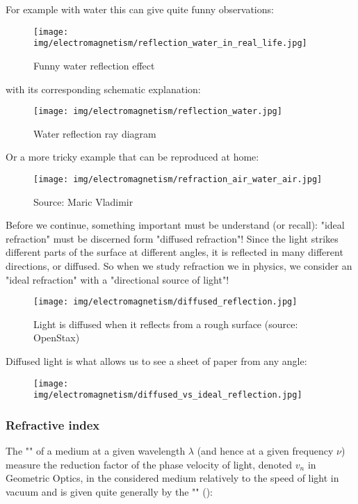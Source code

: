 	For example with water this can give quite funny observations:
	\begin{figure}[H]
		\centering
		\texttt{[image: img/electromagnetism/reflection\_water\_in\_real\_life.jpg]}
		\caption{Funny water reflection effect}
	\end{figure}
	with its corresponding schematic explanation:
	\begin{figure}[H]
		\centering
		\texttt{[image: img/electromagnetism/reflection\_water.jpg]}
		\caption{Water reflection ray diagram}
	\end{figure}
	Or a more tricky example that can be reproduced at home:
	\begin{figure}[H]
		\centering
		\texttt{[image: img/electromagnetism/refraction\_air\_water\_air.jpg]}
		\caption[]{Source: Maric Vladimir}
	\end{figure}
	Before we continue, something important must be understand (or recall): "ideal refraction" must be discerned form "diffused refraction"! Since the light strikes different parts of the surface at different angles, it is reflected in many different directions, or diffused. So when we study refraction we in physics, we consider an "ideal refraction" with a "directional source of light"!
	\begin{figure}[H]
		\centering
		\texttt{[image: img/electromagnetism/diffused\_reflection.jpg]}
		\caption[Light is diffused when it reflects from a rough surface]{Light is diffused when it reflects from a rough surface (source: OpenStax)}
	\end{figure}
	Diffused light is what allows us to see a sheet of paper from any angle:
	\begin{figure}[H]
		\centering
		\texttt{[image: img/electromagnetism/diffused\_vs\_ideal\_reflection.jpg]}
	\end{figure}
	
	\pagebreak
	\subsubsection{Refractive index}
	The "" of a medium at a given wavelength $\lambda$ (and hence at a given frequency $\nu$) measure the reduction factor of the phase velocity of light, denoted $v_n$ in Geometric Optics, in the considered medium relatively to the speed of light in vacuum  and is given quite generally by the "" ():
	
